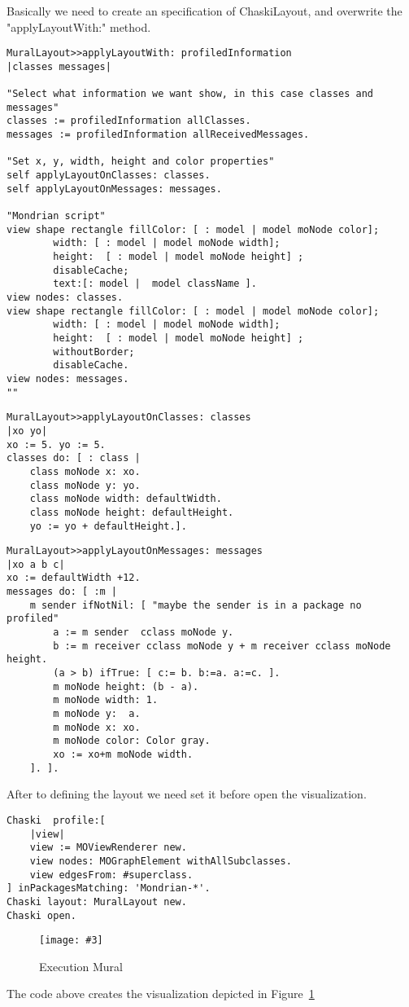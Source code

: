 \documentclass{sig-alternate}
\newcommand{\fig}[4]{
	\begin{figure}[#1]
		\centering
		\texttt{[image: \#3]}
		\caption{\label{fig:#3}#4}
	\end{figure}}
\newcommand{\figref}[1]{Figure~\ref{fig:#1}}
\begin{document}
Basically we need to create an specification of ChaskiLayout, and overwrite the "applyLayoutWith:" method.
\begin{lstlisting}[language=Smalltalk]
MuralLayout>>applyLayoutWith: profiledInformation
|classes messages|

"Select what information we want show, in this case classes and messages"
classes := profiledInformation allClasses.
messages := profiledInformation allReceivedMessages.	

"Set x, y, width, height and color properties"
self applyLayoutOnClasses: classes.
self applyLayoutOnMessages: messages.

"Mondrian script"
view shape rectangle fillColor: [ : model | model moNode color];
		width: [ : model | model moNode width];
		height:  [ : model | model moNode height] ; 
		disableCache;
		text:[: model |  model className ].
view nodes: classes.
view shape rectangle fillColor: [ : model | model moNode color];
		width: [ : model | model moNode width];
		height:  [ : model | model moNode height] ; 
		withoutBorder;
		disableCache.
view nodes: messages.
""
\end{lstlisting}
\begin{lstlisting}[language=Smalltalk]
MuralLayout>>applyLayoutOnClasses: classes
|xo yo|
xo := 5. yo := 5.
classes do: [ : class | 
	class moNode x: xo.   
	class moNode y: yo.
	class moNode width: defaultWidth. 
	class moNode height: defaultHeight. 
	yo := yo + defaultHeight.].
\end{lstlisting}
\begin{lstlisting}[language=Smalltalk]
MuralLayout>>applyLayoutOnMessages: messages
|xo a b c|
xo := defaultWidth +12.
messages do: [ :m | 
	m sender ifNotNil: [ "maybe the sender is in a package no profiled"
		a := m sender  cclass moNode y.
		b := m receiver cclass moNode y + m receiver cclass moNode height.
		(a > b) ifTrue: [ c:= b. b:=a. a:=c. ].
		m moNode height: (b - a).
		m moNode width: 1.
		m moNode y:  a.
		m moNode x: xo.
		m moNode color: Color gray.
		xo := xo+m moNode width.
	]. ].
\end{lstlisting}

After to defining the layout we need set it before open the visualization. 
\begin{lstlisting}[language=Smalltalk]
Chaski  profile:[
	|view|
	view := MOViewRenderer new.
	view nodes: MOGraphElement withAllSubclasses.
	view edgesFrom: #superclass.
] inPackagesMatching: 'Mondrian-*'.
Chaski layout: MuralLayout new.
Chaski open.
\end{lstlisting}
\fig{}{0.5}{ExecutionMural}{Execution Mural}
The code above creates the visualization depicted in \figref{ExecutionMural}
\end{document}
